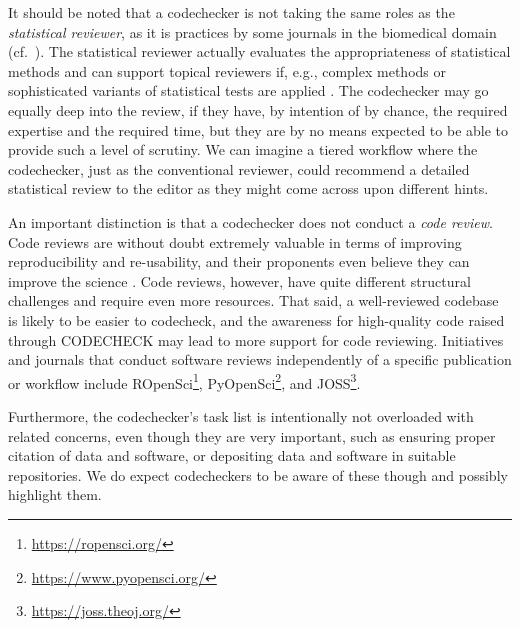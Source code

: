 \documentclass[12pt]{article}
\begin{document}
It should be noted that a codechecker is not taking the same roles as the
\emph{statistical reviewer}, as it is practices by some journals in the 
biomedical domain (cf.~\cite{petrovecki_role_2009,greenwood_how_2015}).
The statistical reviewer actually evaluates the appropriateness of
statistical methods \cite{greenwood_how_2015} and can support topical
reviewers if, e.g., complex methods or sophisticated variants of statistical
tests are applied \cite{petrovecki_role_2009}.
The codechecker may go equally deep into the review, if they have, by 
intention of by chance, the required expertise and the required time, 
but they are by no means expected to be able to provide
such a level of scrutiny. We can imagine a tiered workflow where the 
codechecker, just as the conventional reviewer, could recommend a detailed
statistical review to the editor as they might come across upon different
hints.

An important distinction is that a codechecker does not conduct a 
\emph{code review}. Code reviews are without doubt extremely valuable in 
terms of improving reproducibility and re-usability, and their proponents 
even believe they can improve the science \cite{petre_code_2014}.
Code reviews, however, have quite different structural challenges and 
require even more resources. That said, a well-reviewed codebase is likely
to be easier to codecheck, and the awareness for high-quality code raised
through CODECHECK may lead to more support for code reviewing.
Initiatives and journals that conduct software reviews independently of 
a specific publication or workflow include
ROpenSci\footnote{\url{https://ropensci.org/}},
PyOpenSci\footnote{\url{https://www.pyopensci.org/}},
and JOSS\footnote{\url{https://joss.theoj.org/}}.

Furthermore, the codechecker's task list is intentionally not
overloaded with related concerns, even though they are very important,
such as ensuring proper citation of data and software, or depositing
data and software in suitable repositories. We do expect codecheckers
to be aware of these though and possibly highlight them.
\end{document}
